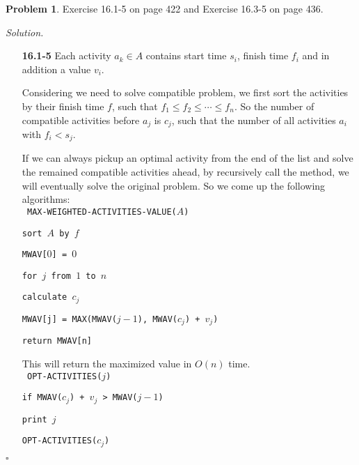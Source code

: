 \documentclass[11pt]{article}
\theoremstyle{definition}
\newtheorem{problem}{Problem}
\newenvironment{solution}{\noindent\emph{Solution.}}{\hfill$\square$}
\newcommand\tab[1][1cm]{\hspace*{#1}}
\begin{document}
\newpage



\begin{problem}
Exercise 16.1-5 on page 422 and Exercise 16.3-5 on page 436.
\end{problem}

\begin{solution}
\begin{enumerate}
  \item[\textbf{16.1-5}]
  Each activity $a_k \in A$ contains start time $s_i$, finish time $f_i$ and in addition a value $v_i$.
  
  Considering we need to solve compatible problem, we first sort the activities by their finish time $f$, such that $f_1 \leq f_2 \leq \cdots \leq f_n$. So the number of compatible activities before $a_j$ is $c_j$, such that the number of all activities $a_i$ with $f_i < s_j$.
  
  If we can always pickup an optimal activity from the end of the list and solve the remained compatible activities ahead, by recursively call the method, we will eventually solve the original problem. So we come up the following algorithms:
  \\
  
\texttt{
    MAX-WEIGHTED-ACTIVITIES-VALUE($A$)}

    \tab \texttt{sort $A$ by $f$}
    
    \tab \texttt{MWAV[$0$] = $0$}
    
    \tab \texttt{for $j$ from $1$ to $n$}
    
    \tab\tab \texttt{calculate $c_j$}
    
    \tab\tab \texttt{MWAV[j] = MAX(MWAV($j - 1$), MWAV($c_j$) + $v_j$)}
    
    \tab \texttt{return MWAV[n]}
    
    This will return the maximized value in $O(n)$ time.\\
    
    
    \texttt{
    OPT-ACTIVITIES($j$)}
    
    \tab \texttt{if MWAV($c_j$) + $v_j$ > MWAV($j - 1$)}
    
    \tab\tab \texttt{print $j$}
    
    \tab\tab \texttt{OPT-ACTIVITIES($c_j$)}
    

\end{enumerate}
\end{solution}
\end{document}
